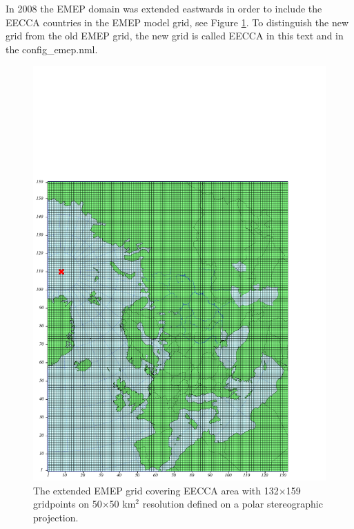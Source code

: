 In 2008 the EMEP domain was extended eastwards in order to include the 
EECCA countries in the EMEP model grid, see Figure \ref{fig:EECCA}. To distinguish the new grid from the old EMEP 
grid, the new grid is called EECCA in this text and in the config\_emep.nml.

\begin{figure}[ht]
 \centering
\includegraphics[scale=0.7]{EECCA}
\caption{The extended EMEP grid covering EECCA area with
132$\times$159 gridpoints on 50$\times$50 km$^2$ resolution defined on
a polar stereographic
projection.}\label{fig:EECCA}
\end{figure}


